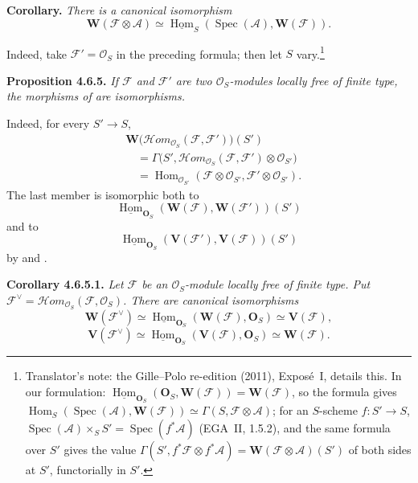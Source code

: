 \medskip
\noindent\textbf{Corollary.}
\textit{There is a canonical isomorphism
\[
  \mathbf W(\mathscr F\otimes\mathscr A)
    \simeq
  \underline{\operatorname{Hom}}_S
    (\operatorname{Spec}(\mathscr A),\mathbf W(\mathscr F)).
\]}

Indeed, take \(\mathscr F'=\mathcal O_S\) in the preceding formula; then
let \(S\) vary.\footnote{Translator's note: the Gille--Polo re-edition (2011), Exposé~I, details this. In
our formulation:
\(\underline{\operatorname{Hom}}_{\mathbf O_S}(\mathbf O_S,\mathbf W(\mathscr F))
=\mathbf W(\mathscr F)\), so the formula gives
\(\operatorname{Hom}_S(\operatorname{Spec}(\mathscr A),\mathbf W(\mathscr F))
\simeq\Gamma(S,\mathscr F\otimes\mathscr A)\); for an \(S\)-scheme
\(f:S'\to S\), \(\operatorname{Spec}(\mathscr A)\times_SS'
=\operatorname{Spec}(f^*\mathscr A)\) (EGA~II, 1.5.2), and the same formula
over \(S'\) gives the value
\(\Gamma(S',f^*\mathscr F\otimes f^*\mathscr A)
=\mathbf W(\mathscr F\otimes\mathscr A)(S')\) of both sides at \(S'\),
functorially in \(S'\).}

\medskip
\noindent{}\textbf{Proposition 4.6.5.}
\textit{If \(\mathscr F\) and \(\mathscr F'\) are two
\(\mathcal O_S\)-modules locally free of finite type, the morphisms of
 are isomorphisms.}

Indeed, for every \(S'\to S\),
\begin{align*}
  &\mathbf W
    \bigl(\mathscr{H}om_{\mathcal O_S}(\mathscr F,\mathscr F')\bigr)(S')\\
  &\quad=
    \Gamma\bigl(S',
      \mathscr{H}om_{\mathcal O_S}(\mathscr F,\mathscr F')
        \otimes\mathcal O_{S'}\bigr)\\
  &\quad=
    \operatorname{Hom}_{\mathcal O_{S'}}
      (\mathscr F\otimes\mathcal O_{S'},
       \mathscr F'\otimes\mathcal O_{S'}).
\end{align*}
The last member is isomorphic both to
\[
  \underline{\operatorname{Hom}}_{\mathbf O_S}
    (\mathbf W(\mathscr F),\mathbf W(\mathscr F'))(S')
\]
and to
\[
  \underline{\operatorname{Hom}}_{\mathbf O_S}
    (\mathbf V(\mathscr F'),\mathbf V(\mathscr F))(S')
\]
by  and .

\medskip
\noindent{}\textbf{Corollary 4.6.5.1.}
\textit{Let \(\mathscr F\) be an \(\mathcal O_S\)-module locally free
of finite type. Put
\(\mathscr F^{\vee}
=\mathscr{H}om_{\mathcal O_S}(\mathscr F,\mathcal O_S)\). There are
canonical isomorphisms
\[
  \mathbf W(\mathscr F^{\vee})
    \simeq
  \underline{\operatorname{Hom}}_{\mathbf O_S}
    (\mathbf W(\mathscr F),\mathbf O_S)
    \simeq\mathbf V(\mathscr F),
\]
\[
  \mathbf V(\mathscr F^{\vee})
    \simeq
  \underline{\operatorname{Hom}}_{\mathbf O_S}
    (\mathbf V(\mathscr F),\mathbf O_S)
    \simeq\mathbf W(\mathscr F).
\]}

